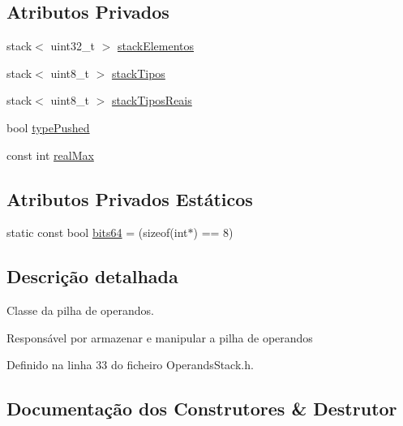 \subsection*{Atributos Privados}
\begin{DoxyCompactItemize}
\item 
stack$<$ uint32\+\_\+t $>$ \hyperlink{classOperandsStack_a4d7bd7c3814e216168022849158c733d}{stack\+Elementos}
\item 
stack$<$ uint8\+\_\+t $>$ \hyperlink{classOperandsStack_ad784cabd1a3153f7a870adf07215189a}{stack\+Tipos}
\item 
stack$<$ uint8\+\_\+t $>$ \hyperlink{classOperandsStack_a14729c0f92cf41d1ec65660a7c82555a}{stack\+Tipos\+Reais}
\item 
bool \hyperlink{classOperandsStack_a375521777d4992bc1018eb40da015e70}{type\+Pushed}
\item 
const int \hyperlink{classOperandsStack_aac5d565f6032231c195411ba4d75d571}{real\+Max}
\end{DoxyCompactItemize}
\subsection*{Atributos Privados Estáticos}
\begin{DoxyCompactItemize}
\item 
static const bool \hyperlink{classOperandsStack_a52dbb05109d9b5c88bae178c6fdf00b3}{bits64} = (sizeof(int$\ast$) == 8)
\end{DoxyCompactItemize}


\subsection{Descrição detalhada}
Classe da pilha de operandos. 

Responsável por armazenar e manipular a pilha de operandos 

Definido na linha 33 do ficheiro Operands\+Stack.\+h.



\subsection{Documentação dos Construtores \& Destrutor}
\mbox{\label{classOperandsStack_a5ea2e7d609262388d0d4bc3ba08a2c32}} 
